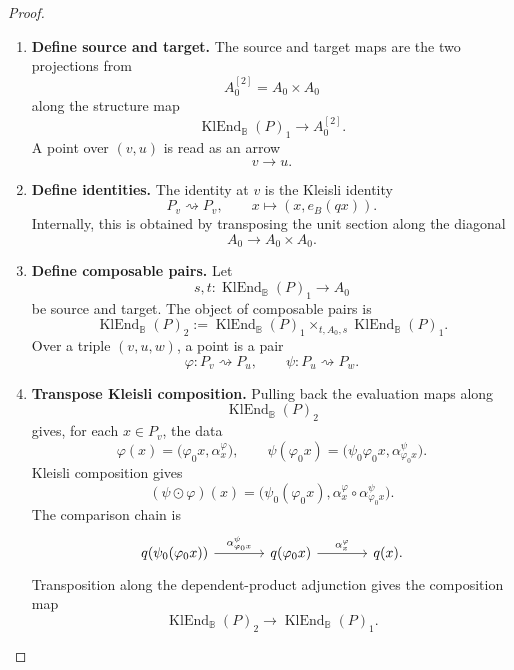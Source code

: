\begin{proof}
    \leavevmode
    \begin{enumerate}
        \item \textbf{Define source and target.}
        The source and target maps are the two projections from
        \[
            A_0^{[2]}=A_0\times A_0
        \]
        along the structure map
        \[
            \operatorname{KlEnd}_{\mathbb B}(P)_1\to A_0^{[2]}.
        \]
        A point over \((v,u)\) is read as an arrow
        \[
            v\to u.
        \]

        \item \textbf{Define identities.}
        The identity at \(v\) is the Kleisli identity
        \[
            P_v\rightsquigarrow P_v,
            \qquad
            x\longmapsto (x,e_B(qx)).
        \]
        Internally, this is obtained by transposing the unit section along the
        diagonal
        \[
            A_0\to A_0\times A_0.
        \]

        \item \textbf{Define composable pairs.}
        Let
        \[
            s,t:\operatorname{KlEnd}_{\mathbb B}(P)_1\to A_0
        \]
        be source and target. The object of composable pairs is
        \[
            \operatorname{KlEnd}_{\mathbb B}(P)_2
            :=
            \operatorname{KlEnd}_{\mathbb B}(P)_1
            \times_{t,A_0,s}
            \operatorname{KlEnd}_{\mathbb B}(P)_1.
        \]
        Over a triple \((v,u,w)\), a point is a pair
        \[
            \varphi:P_v\rightsquigarrow P_u,
            \qquad
            \psi:P_u\rightsquigarrow P_w.
        \]

        \item \textbf{Transpose Kleisli composition.}
        Pulling back the evaluation maps along
        \[
            \operatorname{KlEnd}_{\mathbb B}(P)_2
        \]
        gives, for each \(x\in P_v\), the data
        \[
            \varphi(x)=
            \bigl(\varphi_0x,\alpha^\varphi_x\bigr),
            \qquad
            \psi(\varphi_0x)
            =
            \bigl(\psi_0\varphi_0x,\alpha^\psi_{\varphi_0x}\bigr).
        \]
        Kleisli composition gives
        \[
            (\psi\odot\varphi)(x)
            =
            \bigl(
                \psi_0(\varphi_0x),
                \alpha^\varphi_x\circ\alpha^\psi_{\varphi_0x}
            \bigr).
        \]
        The comparison chain is
        \[
        \begin{tikzcd}[column sep=large, row sep=large]
            q(\psi_0(\varphi_0x))
                \arrow[r, "{\alpha^\psi_{\varphi_0x}}"]
            &
            q(\varphi_0x)
                \arrow[r, "{\alpha^\varphi_x}"]
            &
            q(x).
        \end{tikzcd}
        \]
        Transposition along the dependent-product adjunction gives the
        composition map
        \[
            \operatorname{KlEnd}_{\mathbb B}(P)_2
            \to
            \operatorname{KlEnd}_{\mathbb B}(P)_1.
        \]


\end{enumerate}
\end{proof}
